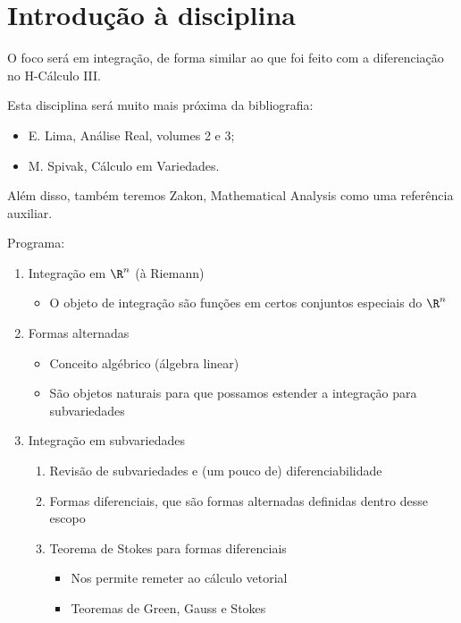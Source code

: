 
\section*{Introdução à disciplina}

O foco será em integração, de forma similar ao que foi feito com a diferenciação no H-Cálculo III.

Esta disciplina será muito mais próxima da bibliografia:
\begin{itemize}
    \item E. Lima, Análise Real, volumes 2 e 3; \\
    \item M. Spivak, Cálculo em Variedades.
\end{itemize}
Além disso, também teremos Zakon, Mathematical Analysis como uma referência auxiliar.

Programa:
\begin{enumerate}
    \item Integração em $\R^{n}$ (à Riemann)
	\begin{itemize}
	    \item O objeto de integração são funções em certos conjuntos especiais do $\R^{n}$
	\end{itemize}
    \item Formas alternadas
	\begin{itemize}
	    \item Conceito algébrico (álgebra linear)
	    \item São objetos naturais para que possamos estender a integração para subvariedades
	\end{itemize}
    \item Integração em subvariedades
	\begin{enumerate}
	    \item Revisão de subvariedades e (um pouco de) diferenciabilidade
	    \item Formas diferenciais, que são formas alternadas definidas dentro desse escopo
	    \item Teorema de Stokes para formas diferenciais
		\begin{itemize}
		    \item Nos permite remeter ao cálculo vetorial
		    \item Teoremas de Green, Gauss e Stokes
		\end{itemize}
	\end{enumerate}
\end{enumerate}

